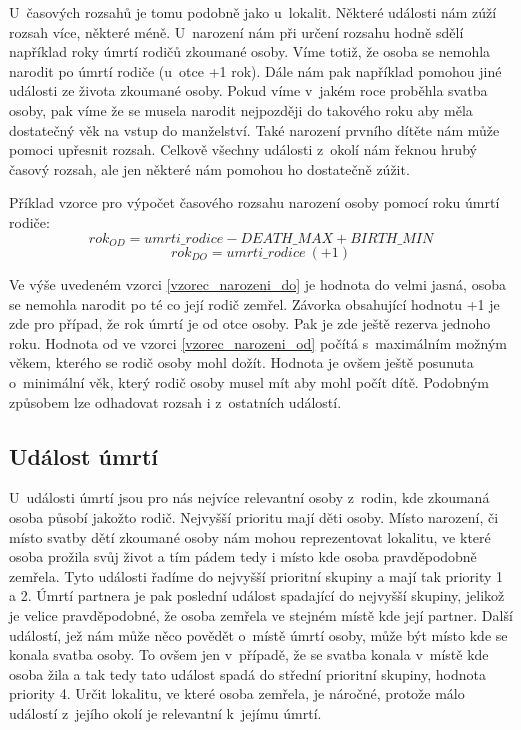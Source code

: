 U~časových rozsahů je tomu podobně jako u~lokalit. Některé události nám zúží rozsah více, některé méně. U~narození nám při určení rozsahu hodně sdělí například roky úmrtí rodičů zkoumané osoby. Víme totiž, že osoba se nemohla narodit po úmrtí rodiče (u~otce +1 rok). Dále nám pak například pomohou jiné události ze života zkoumané osoby. Pokud víme v~jakém roce proběhla svatba osoby, pak víme že se musela narodit nejpozději do takového roku aby měla dostatečný věk na vstup do manželství. Také narození prvního dítěte nám může pomoci upřesnit rozsah. Celkově všechny události z~okolí nám řeknou hrubý časový rozsah, ale jen některé nám pomohou ho dostatečně zúžit.
 
Příklad vzorce pro výpočet časového rozsahu narození osoby pomocí roku úmrtí rodiče:
\begin{equation} \label{vzorec_narozeni_od}
	rok_{OD} = umrti\_rodice - DEATH\_MAX + BIRTH\_MIN
\end{equation}
\begin{equation} \label{vzorec_narozeni_do}
	rok_{DO} = umrti\_rodice\ (+1)
\end{equation}

Ve výše uvedeném vzorci \ref{vzorec_narozeni_do} je hodnota do velmi jasná, osoba se nemohla narodit po té co její rodič zemřel. Závorka obsahující hodnotu +1 je zde pro případ, že rok úmrtí je od otce osoby. Pak je zde ještě rezerva jednoho roku. Hodnota od ve vzorci \ref{vzorec_narozeni_od} počítá s~maximálním možným věkem, kterého se rodič osoby mohl dožít. Hodnota je ovšem ještě posunuta o~minimální věk, který rodič osoby musel mít aby mohl počít dítě. Podobným způsobem lze odhadovat rozsah i z~ostatních událostí.

\subsection{Událost úmrtí}
U~události úmrtí jsou pro nás nejvíce relevantní osoby z~rodin, kde zkoumaná osoba působí jakožto rodič. Nejvyšší prioritu mají děti osoby. Místo narození, či místo svatby dětí zkoumané osoby nám mohou reprezentovat lokalitu, ve které osoba prožila svůj život a tím pádem tedy i místo kde osoba pravděpodobně zemřela. Tyto události řadíme do nejvyšší prioritní skupiny a mají tak priority 1 a 2. Úmrtí partnera je pak poslední událost spadající do nejvyšší skupiny, jelikož je velice pravděpodobné, že osoba zemřela ve stejném místě kde její partner. Další událostí, jež nám může něco povědět o~místě úmrtí osoby, může být místo kde se konala svatba osoby. To ovšem jen v~případě, že se svatba konala v~místě kde osoba žila a tak tedy tato událost spadá do střední prioritní skupiny, hodnota priority 4. Určit lokalitu, ve které osoba zemřela, je náročné, protože málo událostí z~jejího okolí je relevantní k~jejímu úmrtí.

